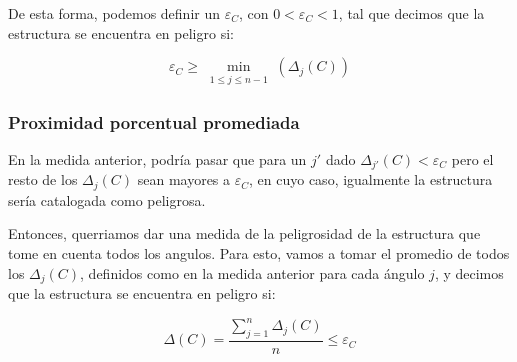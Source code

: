 De esta forma, podemos definir un $\varepsilon_C$, con $0 < \varepsilon_C < 1 $, tal que decimos que la estructura se encuentra en peligro si:

$$\varepsilon_C \geq \min\limits_{\substack{1 \leq j \leq n-1}}(\Delta_j(C))$$

\subsubsection{Proximidad porcentual promediada}

En la medida anterior, podría pasar que para un $j'$ dado $\Delta_{j'}(C) < \varepsilon_C$ pero el resto de los $\Delta_j(C)$ sean mayores a $\varepsilon_C$, en cuyo caso, igualmente la estructura sería catalogada como peligrosa.

Entonces, querriamos dar una medida de la peligrosidad de la estructura que tome en cuenta todos los angulos. Para esto, vamos a tomar el promedio de todos los $\Delta_j(C)$, definidos como en la medida anterior para cada ángulo $j$, y decimos que la estructura se encuentra en peligro si:

$$\Delta(C)= \frac{\sum\limits_{j=1}^{n}{\Delta_j(C)}}{n} \leq  \varepsilon_C$$
